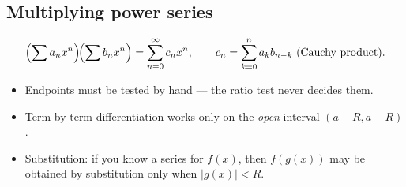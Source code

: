 \subsection{Multiplying power series}
\[
\Bigl(\sum a_n x^n\Bigr)\!\Bigl(\sum b_n x^n\Bigr) = \sum_{n=0}^\infty c_n x^n,
\qquad c_n = \sum_{k=0}^n a_k b_{n-k}\ \text{(Cauchy product)}.
\]

\begin{pitfallbox}
\begin{itemize}[leftmargin=*,nosep]
  \item Endpoints must be tested by hand --- the ratio test never decides them.
  \item Term-by-term differentiation works only on the \emph{open} interval $(a-R, a+R)$.
  \item Substitution: if you know a series for $f(x)$, then $f(g(x))$ may be obtained by
        substitution only when $|g(x)| < R$.
\end{itemize}
\end{pitfallbox}
